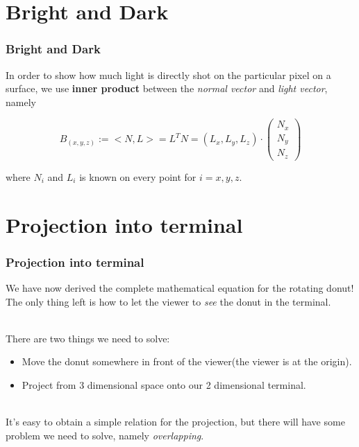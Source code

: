 \documentclass[12pt, t]{beamer}
\renewcommand{\emph}[1]{{\color{Turquoise3}\textsl{#1}}}
\newcommand{\nullspace}{~\\[15pt]}
\begin{document}
\section{Bright and Dark}
\begin{frame}
    \frametitle{Bright and Dark}

    In order to show how much light is directly shot on the particular pixel on a
    surface, we use \textbf{inner product} between the \emph{normal vector} and \emph{light vector},
    namely

    \begin{equation*}
        B_{(x,y,z)} := <N,L> =L^T N = 
        (L_x,L_y,L_z)
        \cdot
        \begin{pmatrix}
            N_x \\
            N_y \\
            N_z
        \end{pmatrix}
    \end{equation*}

    where $N_i$ and $L_i$ is known on every point for $i = x,y,z$.

\end{frame}


\section{Projection into terminal}
\begin{frame}
    \frametitle{Projection into terminal}

    We have now derived the complete mathematical equation for the rotating donut! The 
    only thing left is how to let the viewer to \emph{see} the donut in the terminal.

    \nullspace
    There are two things we need to solve:
    \begin{itemize}
        \item Move the donut somewhere in front of the viewer(the viewer is at the origin).
        \item Project from 3 dimensional space onto our 2 dimensional terminal.
    \end{itemize}

    \nullspace
    It's easy to obtain a simple relation for the projection, but there will have some problem 
    we need to solve, namely \emph{overlapping}.

\end{frame}
\end{document}
